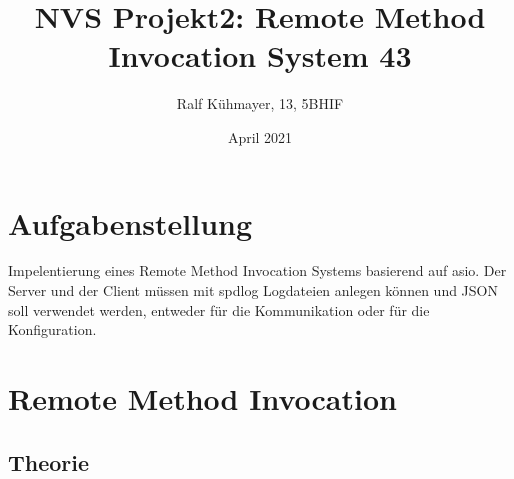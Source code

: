 \documentclass[a4paper,12pt,titlepage]{scrartcl}
\title{NVS Projekt2: Remote Method Invocation System 43}
\author{Ralf Kühmayer, 13, 5BHIF}
\date{April 2021}
\begin{document}
\maketitle

\newpage

\tableofcontents

\newpage


\section{Aufgabenstellung}
Impelentierung eines Remote Method Invocation Systems basierend auf asio. Der Server und der Client müssen mit spdlog Logdateien anlegen können und JSON soll verwendet werden, entweder für die Kommunikation oder für die Konfiguration.

\section{Remote Method Invocation}

\subsection{Theorie}
\end{document}
